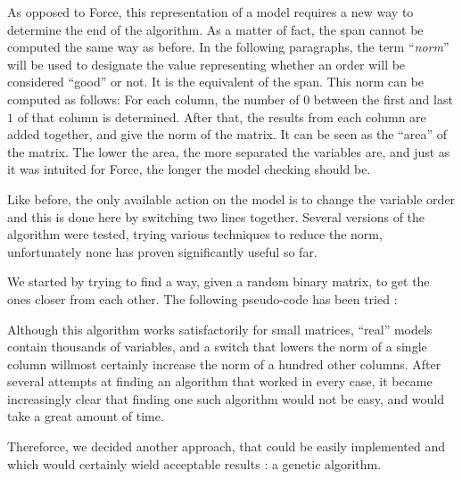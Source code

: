 \documentclass[12pt]{report}
\begin{document}
As opposed to Force, this representation of a model requires a new way to determine the end of the algorithm. As a matter of fact, the span cannot be computed the same way as before. In the following paragraphs, the term \enquote{\it{norm}} will be used to designate the value representing whether an order will be considered \enquote{good} or not. It is the equivalent of the span. This norm can be computed as follows:
For each column, the number of 0 between the first and last $1$ of that column is determined. After that, the results from each column are added together, and give the norm of the matrix. It can be seen as the \enquote{area} of the matrix. The lower the area, the more separated the variables are, and just as it was intuited for Force, the longer the model checking should be.

Like before, the only available action on the model is to change the variable order and this is done here by switching two lines together. Several versions of the algorithm were tested, trying various techniques to reduce the norm, unfortunately none has proven significantly useful so far. 

We started by trying to find a way, given a random binary matrix, to get the ones closer from each other. The following pseudo-code has been tried :

\begin{algorithm}
\begin{algorithmic}[1]
    \EndIf
  \EndWhile
\EndFunction
\end{algorithmic}
\end{algorithm}

Although this algorithm works satisfactorily for small matrices, \enquote{real} models contain thousands of variables, and a switch that lowers the norm of a single column willmost certainly increase the norm of a hundred other columns.
After several attempts at finding an algorithm that worked in every case, it became increasingly clear that finding one such algorithm would not be easy, and would take a great amount of time.

Thereforce, we decided another approach, that could be easily implemented and which would certainly wield acceptable results : a genetic algorithm. 
\end{document}

